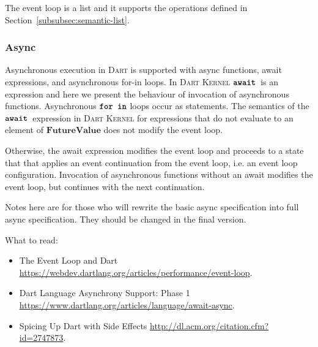 \documentclass[a4paper,oneside,fleqn]{article}
\newcommand{\kernel}{\textsc{Dart Kernel}}
\newcommand{\dart}{\textsc{Dart}}
\newcommand{\synt}[1]{\ensuremath{\text{\textbf{\texttt{#1}}}}}
\begin{document}
The event loop is a list and it supports the operations defined in Section~\ref{subsubsec:semantic-list}.

\subsubsection{Async}
\label{subsubsec:async}
\renewcommand{\StartNK}[4]{\mathrm{StartNK}({#1},\,{#2},\,{#3},\,\ExceptionHandlersRest,\,{#4})}
\newcommand{\CompleteFutureEK}[1]{\mathrm{CompleteFutureEK}({#1})}
\newcommand{\AwaitReturnNK}[2]{\mathrm{AwaitReturnNK}({#1},\,{#2})}
\newcommand{\AwaitEK}{\mathrm{AwaitEK}(\econt)}
\newcommand{\AsyncStaticInvA}[4]{\mathrm{AsyncStaticInvA}({#1},\,{#2},\,{#3},\,\ExceptionHandlersRest,\,{#4})}
\newcommand{\FutureValue}[1]{\mathrm{FutureValue}(#1)}
\newcommand{\dfuture}{\mathbf{FutureValue}}

Asynchronous execution in \dart{} is supported with async functions, await expressions, and asynchronous for-in loops.
In \kernel{} $\AwaitExpression{}$ is an expression and here we present the behaviour of invocation of asynchronous functions.
Asynchronous \synt{for in} loops occur as statements.
The semantics of the $\AwaitExpression{}$ expression in \kernel{} for expressions that do not evaluate to an element of $\dfuture$ does not modify the event loop.

Otherwise, the await expression modifies the event loop and proceeds to a state that that applies an event continuation from the event loop, i.e. an event loop configuration.
Invocation of asynchronous functions without an await modifies the event loop, but continues with the next continuation.

Notes here are for those who will rewrite the basic async specification into full async specification.
They should be changed in the final version.

What to read:
\begin{itemize}
    \item The Event Loop and Dart \url{https://webdev.dartlang.org/articles/performance/event-loop}.

    \item Dart Language Asynchrony Support: Phase 1 \url{https://www.dartlang.org/articles/language/await-async}.

    \item Spicing Up Dart with Side Effects \url{http://dl.acm.org/citation.cfm?id=2747873}.

\end{itemize}
\end{document}
